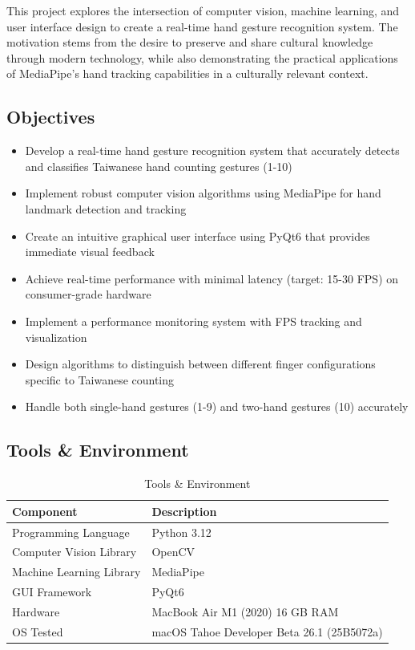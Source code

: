 \documentclass{article}
\begin{document}
This project explores the intersection of computer vision, machine learning, and user interface design to create a real-time hand gesture recognition system. The motivation stems from the desire to preserve and share cultural knowledge through modern technology, while also demonstrating the practical applications of MediaPipe's hand tracking capabilities in a culturally relevant context.

\subsection{Objectives}

\begin{itemize}
	\item Develop a real-time hand gesture recognition system that accurately detects and classifies Taiwanese hand counting gestures (1-10)
	\item Implement robust computer vision algorithms using MediaPipe for hand landmark detection and tracking
	\item Create an intuitive graphical user interface using PyQt6 that provides immediate visual feedback
	\item Achieve real-time performance with minimal latency (target: 15-30 FPS) on consumer-grade hardware
	\item Implement a performance monitoring system with FPS tracking and visualization
	\item Design algorithms to distinguish between different finger configurations specific to Taiwanese counting
	\item Handle both single-hand gestures (1-9) and two-hand gestures (10) accurately
\end{itemize}

\subsection{Tools \& Environment}

\begin{table}[H]
	\centering
	\begin{tabular}{|l|l|}
		\hline
		\textbf{Component} & \textbf{Description} \\\hline
		Programming Language & Python 3.12 \\\hline
		Computer Vision Library & OpenCV \\\hline
		Machine Learning Library & MediaPipe \\\hline
		GUI Framework & PyQt6 \\\hline
		Hardware & MacBook Air M1 (2020) 16 GB RAM \\\hline
		OS Tested & macOS Tahoe Developer Beta 26.1 (25B5072a)\\\hline
	\end{tabular}
	\caption{Tools \& Environment}
\end{table}
\end{document}
